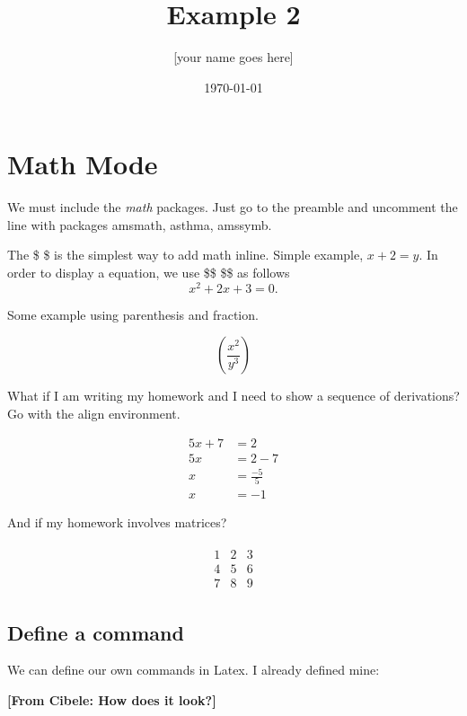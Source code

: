 \documentclass[11pt]{article}    %
\title{Example 2}
\author{[your name goes here]}
\date{\today} %
\newcommand{\cibele}[1]{\textbf{{[\small From Cibele: #1]}}}
\begin{document}
\maketitle

\section{Math Mode}

We must include the \emph{math} packages. Just go to the preamble and uncomment the line with packages amsmath, asthma, amssymb.

The \$ \$ is the simplest way to add math inline. Simple example, $x + 2 = y$. In order to display a equation, we use \$\$ \$\$ as follows
$$ x^2 + 2x + 3 =0.$$

Some example using parenthesis and fraction.

$$\left(\frac{x^2}{y^3}\right)$$

What if I am writing my homework and I need to show a sequence of derivations? Go with the align environment. 

\begin{align}
5x + 7 &= 2 \\
 5x &= 2 -7 \\
 x&= \frac{-5}{5} \nonumber \\
 x &= -1
\end{align}

And if my homework involves matrices? 

\begin{align*}
\begin{matrix} %
1 & 2 & 3 \\
4 & 5 & 6 \\
7 & 8 & 9
\end{matrix} 
\end{align*}

\subsection{Define a command}

We can define our own commands in Latex. I already defined mine:

\cibele{How does it look?}
\end{document}
